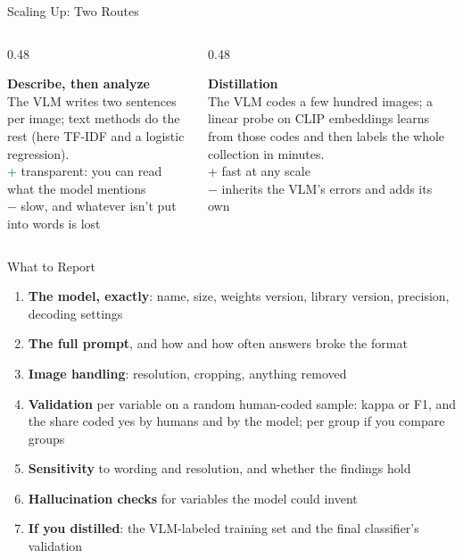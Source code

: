 \begin{frame}{Scaling Up: Two Routes}
\begin{columns}[T]
\begin{column}{0.48\textwidth}
\begin{greenbox}[height=4.3cm]
\textbf{Describe, then analyze}\\[2pt]
The VLM writes two sentences per image; text methods do the rest (here TF-IDF and a logistic
regression).\\[3pt]
\textcolor{darkgreen}{+} transparent: you can read what the model mentions\\
\textcolor{warnborder}{$-$} slow, and whatever isn't put into words is lost
\end{greenbox}
\end{column}
\begin{column}{0.48\textwidth}
\begin{navybox}[height=4.3cm]
\textbf{Distillation}\\[2pt]
The VLM codes a few hundred images; a linear probe on CLIP embeddings learns from those codes and
then labels the whole collection in minutes.\\[3pt]
+ fast at any scale\\
$-$ inherits the VLM's errors and adds its own
\end{navybox}
\end{column}
\end{columns}

\vspace{0.2cm}
\end{frame}

\begin{frame}{What to Report}
\begin{enumerate}
\setlength{\itemsep}{3pt}
\item \textbf{The model, exactly}: name, size, weights version, library version, precision,
      decoding settings
\item \textbf{The full prompt}, and how and how often answers broke the format
\item \textbf{Image handling}: resolution, cropping, anything removed
\item \textbf{Validation} per variable on a random human-coded sample: kappa or F1, and the share
      coded yes by humans and by the model; per group if you compare groups
\item \textbf{Sensitivity} to wording and resolution, and whether the findings hold
\item \textbf{Hallucination checks} for variables the model could invent
\item \textbf{If you distilled}: the VLM-labeled training set and the final classifier's validation
\end{enumerate}
\end{frame}

